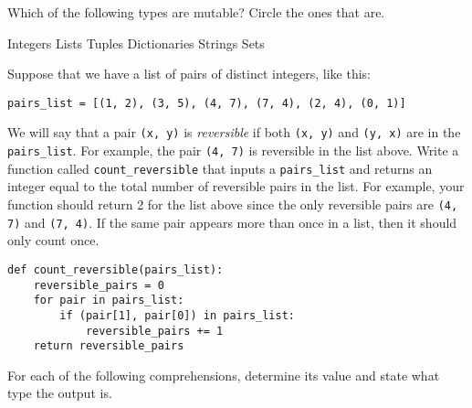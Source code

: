 \documentclass[12pt]{exam}
\begin{document}
\begin{questions}
\newpage
\question Which of the following types are mutable?  Circle the ones that are.
\begin{choices}
\choice Integers
\CorrectChoice Lists
\choice Tuples
\CorrectChoice Dictionaries
\choice Strings
\CorrectChoice Sets
\end{choices}
\smallskip
\question Suppose that we have a list of pairs of distinct integers, like this:
\begin{center}
\verb|pairs_list = [(1, 2), (3, 5), (4, 7), (7, 4), (2, 4), (0, 1)]| 
\end{center}
We will say that a pair \verb|(x, y)| is \emph{reversible} if both \verb|(x, y)| and \verb|(y, x)| are in the \verb|pairs_list|. For example, the pair \verb|(4, 7)| is reversible in the list above.  Write a function called \verb|count_reversible| that inputs a \verb|pairs_list| and returns an integer equal to the total number of reversible pairs in the list.  For example, your function should return 2 for the list above since the only reversible pairs are \verb|(4, 7)| and \verb|(7, 4)|.  If the same pair appears more than once in a list, then it should only count once. %
\begin{solution}
\begin{verbatim}
def count_reversible(pairs_list):
    reversible_pairs = 0
    for pair in pairs_list:
        if (pair[1], pair[0]) in pairs_list:
            reversible_pairs += 1
    return reversible_pairs
\end{verbatim}
\end{solution}

\vfill
\newpage

\question For each of the following comprehensions, determine its value and state what type the output is.  
\end{questions}
\end{document}
